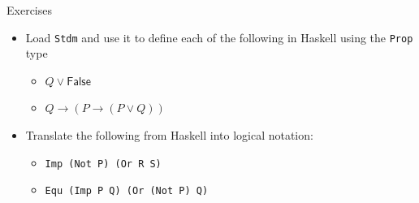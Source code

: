\documentclass[11pt,t,pdf,xcolor=svgnames,aspectratio=169]{beamer}
\providecommand{\tightlist}{%
  \setlength{\itemsep}{5pt}\setlength{\parskip}{0pt}}
\begin{document}
\begin{frame}[fragile]{Exercises}
\protect\hypertarget{exercises}{}
\begin{itemize}
\item
  Load \texttt{Stdm} and use it to define each of the following in
  Haskell using the \texttt{Prop} type

  \begin{itemize}
  \tightlist
  \item
    \(Q \lor \textsf{False}\)
  \item
    \(Q \to (P \to (P \lor Q))\)
  \end{itemize}
\item
  Translate the following from Haskell into logical notation:

  \begin{itemize}
  \tightlist
  \item
    \texttt{Imp\ (Not\ P)\ (Or\ R\ S)}
  \item
    \texttt{Equ\ (Imp\ P\ Q)\ (Or\ (Not\ P)\ Q)}
  \end{itemize}
\end{itemize}
\end{frame}
\end{document}

